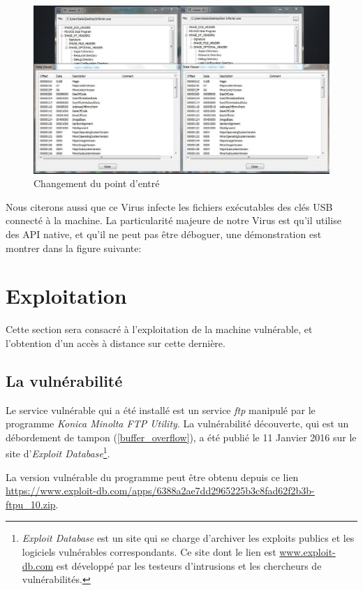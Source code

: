     \begin{figure}[h]
        \centering
        \includegraphics[width=\linewidth]{images/pe_changes.png}
        \caption{Changement du point d'entré}
        \label{changement_point_entree}
    \end{figure}

    Nous citerons aussi que ce Virus infecte les fichiers exécutables des clés USB connecté à la machine.
    La particularité majeure de notre Virus est qu’il utilise des API native, et qu’il ne peut pas être 
    déboguer, une démonstration est montrer dans la figure suivante:

\section{Exploitation}
Cette section sera consacré à l'exploitation de la machine vulnérable, et l'obtention d'un accès à distance
sur cette dernière.
    \subsection{La vulnérabilité}
    Le service vulnérable qui a été installé est un service \emph{ftp} manipulé par le programme 
    \emph{Konica Minolta FTP Utility}. 
    La vulnérabilité découverte, qui est un débordement de tampon (\autoref{buffer_overflow}), a été publié le 11
    Janvier 2016 sur le site d'\emph{Exploit Database}\footnote{\emph{Exploit Database} est un site qui se charge
    d'archiver les exploits publics et les logiciels vulnérables correspondants. Ce site dont le lien est 
    \url{www.exploit-db.com} est développé par les testeurs d'intrusions et les chercheurs de vulnérabilités.}.

    La version vulnérable du programme peut être obtenu depuis ce lien 
    \url{https://www.exploit-db.com/apps/6388a2ae7dd2965225b3c8fad62f2b3b-ftpu_10.zip}.

